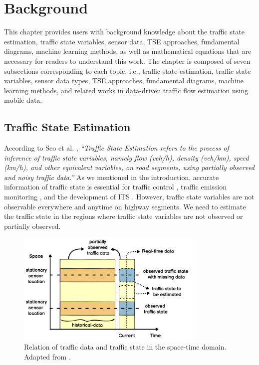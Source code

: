 \documentclass[english]{kththesis}
\begin{document}
\cleardoublepage
\chapter{Background}
\label{ch:background}
This chapter provides users with background knowledge about the traffic state estimation, traffic state variables, sensor data, TSE approaches, fundamental diagrams, machine learning methods, as well as mathematical equations that are necessary for readers to understand this work. The chapter is composed of seven subsections corresponding to each topic, i.e., traffic state estimation, traffic state variables, sensor data types, TSE approaches, fundamental diagrams, machine learning methods, and related works in data-driven traffic flow estimation using mobile data.

\section{Traffic State Estimation}
\label{sec:tse}
According to Seo et al. \cite{seo_tse}, \textit{“Traffic State Estimation refers to the process of inference of traffic state variables, namely flow (veh/h), density (veh/km), speed (km/h), and other equivalent variables, on road segments, using partially observed and noisy traffic data.”} As we mentioned in the introduction, accurate information of traffic state is essential for traffic control \cite{seo_tse}, traffic emission monitoring \cite{tsanakas_emission_estimation}, and the development of ITS \cite{seo_tse_xfcd}. However, traffic state variables are not observable everywhere and anytime on highway segments. We need to estimate the traffic state in the regions where traffic state variables are not observed or partially observed. 

\begin{figure}[!ht]
    \centering
    \includegraphics[width=0.8\textwidth]{tse_diagram.png}
    \caption{Relation of traffic data and traffic state in the space-time domain. Adapted from \cite{seo_tse}.}
    \label{fig:tse}
\end{figure}
\end{document}

